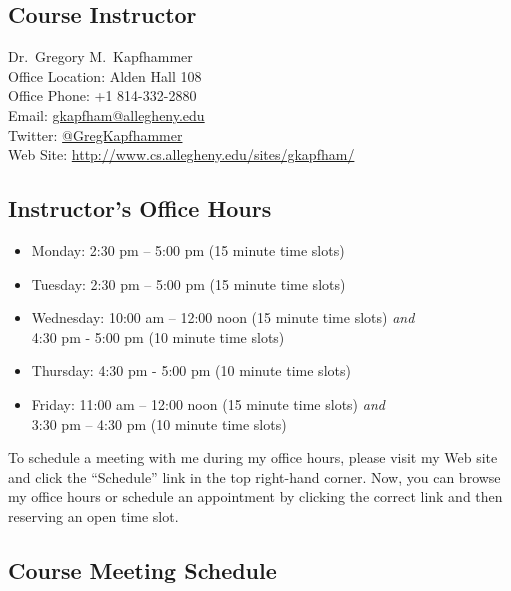 

\usepackage[compact]{titlesec}



\subsection*{Course Instructor}
Dr.\ Gregory M.\ Kapfhammer\\
\noindent Office Location: Alden Hall 108 \\
\noindent Office Phone: +1 814-332-2880 \\
\noindent Email: \url{gkapfham@allegheny.edu} \\
\noindent Twitter: \url{@GregKapfhammer} \\
\noindent Web Site: \url{http://www.cs.allegheny.edu/sites/gkapfham/} 

\subsection*{Instructor's Office Hours}

\begin{itemize}
	\itemsep 0em
	\item Monday: 2:30 pm -- 5:00 pm (15 minute time slots)
	\item Tuesday: 2:30 pm -- 5:00 pm (15 minute time slots)
        \item Wednesday: 10:00 am -- 12:00 noon (15 minute time slots) {\em and} \\ \hspace*{.8in}
          4:30 pm - 5:00 pm (10 minute time slots)
	\item Thursday: 4:30 pm - 5:00 pm (10 minute time slots)
	\item Friday: 11:00 am -- 12:00 noon (15 minute time slots) {\em and} \\ \hspace*{.49in} 3:30 pm -- 4:30 pm (10 minute time slots)
\end{itemize}

\noindent
To schedule a meeting with me during my office hours, please visit my Web site and click the ``Schedule'' link in the
top right-hand corner. Now, you can browse my office hours or schedule an appointment by clicking the correct link and
then reserving an open time slot. 

\subsection*{Course Meeting Schedule}

